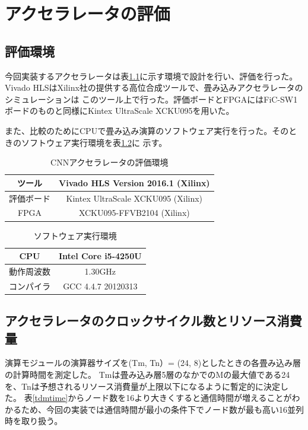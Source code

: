\chapter{アクセラレータの評価}
\section{評価環境}
今回実装するアクセラレータは表\ref{evalu}に示す環境で設計を行い、評価を行った。
Vivado HLSはXilinx社の提供する高位合成ツールで、畳み込みアクセラレータのシミュレーションは
このツール上で行った。評価ボードとFPGAにはFiC-SW1ボードのものと同様にKintex UltraScale XCKU095を用いた。

また、比較のためにCPUで畳み込み演算のソフトウェア実行を行った。そのときのソフトウェア実行環境を表\ref{evacpu}に
示す。

\begin{table}[ht]
 \begin{center}
  \caption{CNNアクセラレータの評価環境}
   \begin{tabular}{|c|c|} \hline
     ツール & Vivado HLS Version 2016.1 (Xilinx) \\ \hline
     評価ボード & Kintex UltraScale XCKU095 (Xilinx) \\ \hline
     FPGA & XCKU095-FFVB2104 (Xilinx)　\\ \hline
  \end{tabular}
  \label{evalu}  
 \end{center}
\end{table}

\begin{table}[ht]
 \begin{center}
  \caption{ソフトウェア実行環境}
   \begin{tabular}{|c|c|} \hline
     CPU & Intel Core i5-4250U \\ \hline
     動作周波数 & 1.30GHz \\ \hline
     コンパイラ & GCC 4.4.7 20120313 \\ \hline
  \end{tabular}
  \label{evacpu}  
 \end{center}
\end{table}

\section{アクセラレータのクロックサイクル数とリソース消費量}
演算モジュールの演算器サイズを(Tm, Tn）= (24, 8)としたときの各畳み込み層の計算時間を測定した。
Tmは畳み込み層5層のなかでのMの最大値である24を、Tnは予想されるリソース消費量が上限以下になるように暫定的に決定した。
表\ref{tdmtime}からノード数を16より大きくすると通信時間が増えることがわかるため、今回の実装では通信時間が最小の条件下でノード数が最も高い16並列時を取り扱う。

